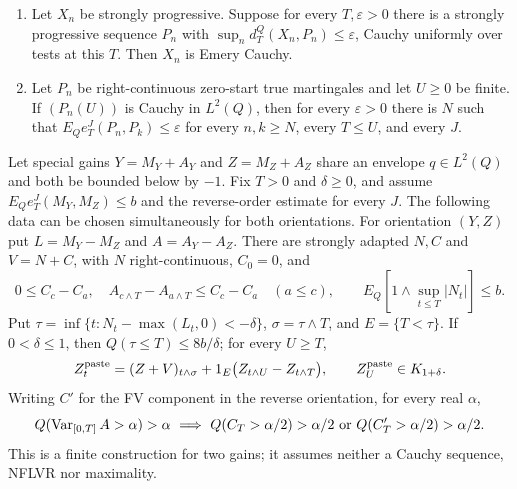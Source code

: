 \begin{proposition}\label{input:approximation}
\leavevmode\par
\begin{enumerate}
\item {}
Let $X_n$ be strongly progressive. Suppose for every $T,\varepsilon>0$ there is a strongly progressive sequence $P_n$
with $\sup_n d_T^Q(X_n,P_n)\leq\varepsilon$, Cauchy uniformly over tests at this $T$.
Then $X_n$ is Emery Cauchy.
\item {}
Let $P_n$ be right-continuous zero-start true martingales and let $U\geq0$ be finite.
If $(P_n(U))$ is Cauchy in $L^2(Q)$, then for every $\varepsilon>0$ there is $N$ such that
$E_Qe_T^J(P_n,P_k)\leq\varepsilon$ for every $n,k\geq N$, every $T\leq U$, and every $J$.
\end{enumerate}
\end{proposition}

\begin{proposition}\label{input:hahn}
Let special gains $Y=M_Y+A_Y$ and $Z=M_Z+A_Z$ share an envelope $q\in L^2(Q)$ and both be bounded below by $-1$.
Fix $T>0$ and $\delta\geq0$, and assume $E_Qe_T^J(M_Y,M_Z)\leq b$ and the reverse-order estimate for every $J$.
The following data can be chosen simultaneously for both orientations. For orientation $(Y,Z)$ put $L=M_Y-M_Z$ and $A=A_Y-A_Z$.
There are strongly adapted $N,C$ and $V=N+C$, with $N$ right-continuous, $C_0=0$, and
\[
 0\leq C_c-C_a,\quad A_{c\wedge T}-A_{a\wedge T}\leq C_c-C_a\quad(a\leq c),
 \qquad E_Q[1\wedge\sup_{t\leq T}|N_t|]\leq b.
\]
Put $\tau=\inf\{t:N_t-\max(L_t,0)<-\delta\}$, $\sigma=\tau\wedge T$, and $E=\{T<\tau\}$.
If $0<\delta\leq1$, then $Q(\tau\leq T)\leq8b/\delta$; for every $U\geq T$,
\[
 Z^{\rm paste}_t=(Z+V)_{t\wedge\sigma}
       +1_E\bigl(Z_{t\wedge U}-Z_{t\wedge T}\bigr),\qquad
 Z^{\rm paste}_U\in K_{1+\delta}.
\]
Writing $C'$ for the FV component in the reverse orientation, for every real $\alpha$,
\[
 Q(\operatorname{Var}_{[0,T]}A>\alpha)>\alpha
 \ \Longrightarrow\ Q(C_T>\alpha/2)>\alpha/2
 \ \text{or}\ Q(C'_T>\alpha/2)>\alpha/2.
\]
This is a finite construction for two gains; it assumes neither a Cauchy sequence, NFLVR nor maximality.
\end{proposition}

